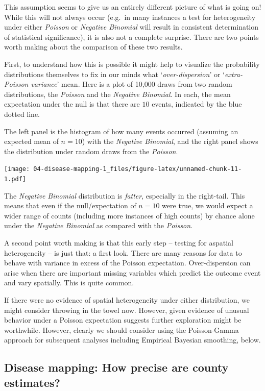 \documentclass[
]{book}
\begin{document}
This assumption seems to give us an entirely different picture of what is going on! While this will not always occur (e.g.~in many instances a test for heterogeneity under either \emph{Poisson} or \emph{Negative Binomial} will result in consistent determination of statistical significance), it is also not a complete surprise. There are two points worth making about the comparison of these two results.

First, to understand how this is possible it might help to visualize the probability distributions themselves to fix in our minds what `\emph{over-dispersion}' or `\emph{extra-Poisson variance}' mean. Here is a plot of 10,000 draws from two random distributions, the \emph{Poisson} and the \emph{Negative Binomial}. In each, the mean expectation under the null is that there are \(10\) events, indicated by the blue dotted line.

The left panel is the histogram of how many events occurred (assuming an expected mean of \(n=10\)) with the \emph{Negative Binomial}, and the right panel shows the distribution under random draws from the \emph{Poisson}.

\texttt{[image: 04-disease-mapping-1\_files/figure-latex/unnamed-chunk-11-1.pdf]}

The \emph{Negative Binomial} distribution is \emph{fatter}, especially in the right-tail. This means that even if the null/expectation of \(n=10\) were true, we would expect a wider range of counts (including more instances of high counts) by chance alone under the \emph{Negative Binomial} as compared with the \emph{Poisson}.

A second point worth making is that this early step -- testing for aspatial heterogeneity -- is just that: a first look. There are many reasons for data to behave with variance in excess of the Poisson expectation. Over-dispersion can arise when there are important missing variables which predict the outcome event and vary spatially. This is quite common.

If there were no evidence of spatial heterogeneity under either distribution, we might consider throwing in the towel now. However, given evidence of unusual behavior under a Poisson expectation suggests further exploration might be worthwhile. However, clearly we should consider using the Poisson-Gamma approach for subsequent analyses including Empirical Bayesian smoothing, below.

\hypertarget{disease-mapping-how-precise-are-county-estimates}{%
\subsection{Disease mapping: How precise are county estimates?}\label{disease-mapping-how-precise-are-county-estimates}}
\end{document}
